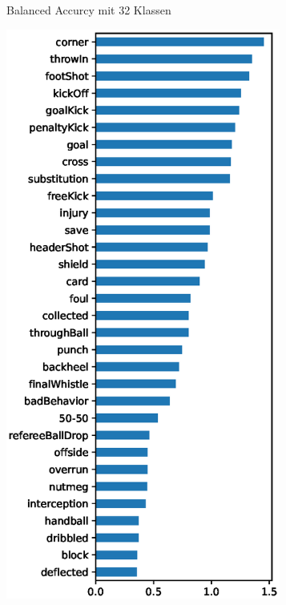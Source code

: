 \begin{figure}
\begin{subfigure}{.24\textwidth}
        \caption{Balanced Accurcy \newline mit 32 Klassen}
        \label{fig:ba_by_class}
    \end{subfigure}%
    \begin{subfigure}{.24\textwidth}
        \centering
        \includegraphics[width=0.99\textwidth, keepaspectratio, interpolate]{img/07_pca_by_class_ph_2.eps}

\end{subfigure}
\end{figure}
